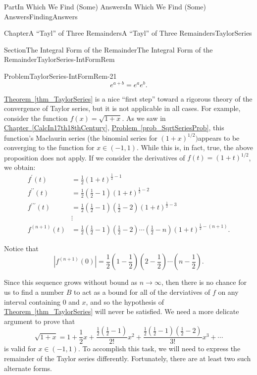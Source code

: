 \documentclass[oneside,10pt,]{book}
\newcommand{\xreffont}{\relax}
\numberwithin{equation}{part}
\newcommand{\amp}{&}
\begin{document}
\begin{partptx}{Part}{In Which We Find (Some) Answers}{}{In Which We Find (Some) Answers}{}{}{FindingAnswers}
\begin{chapterptx}{Chapter}{A ``Tayl'' of Three Remainders}{}{A ``Tayl'' of Three Remainders}{}{}{TaylorSeries}
\begin{sectionptx}{Section}{The Integral Form of the Remainder}{}{The Integral Form of the Remainder}{}{}{TaylorSeries-IntFormRem}
\begin{problem}{Problem}{}{TaylorSeries-IntFormRem-21}
\begin{equation*}
e^{a+b}=e^ae^b.
\end{equation*}
%
\end{problem}
\hyperref[thm_TaylorSeries]{Theorem~{\xreffont\ref{thm_TaylorSeries}}} is a nice ``first step'' toward a rigorous theory of the convergence of Taylor series, but it is not applicable in all cases. For example, consider the function \(f(x)=\sqrt{1+x}\). As we saw in \hyperref[CalcIn17th18thCentury]{Chapter~{\xreffont\ref{CalcIn17th18thCentury}}}, \hyperref[prob_SqrtSeriesProb]{Problem~{\xreffont\ref{prob_SqrtSeriesProb}}}, this function's Maclaurin series (the binomial series for \(\left(1+x\right)^{1/2})\)appears to be converging to the function for \(x\in(-1,1)\). While this is, in fact, true, the above proposition does not apply. If we consider the derivatives of \(f(t)=(1+t)^{1/2}\), we obtain:%
\begin{align*}
f^\prime(t)\amp =\frac{1}{2}(1+t)^{\frac{1}{2}-1}\\
f^{\prime\prime}(t)\amp =\frac{1}{2}\left(\frac{1}{2}-1\right)(1+t)^{\frac{1}{2}-2}\\
f^{\prime\prime\prime}(t)\amp =\frac{1}{2}\left(\frac{1}{2}-1\right)\left(\frac{1}{2}-2 \right)(1+t)^{\frac{1}{2}-3}\\
\amp \vdots\\
f^{(n+1)}(t)\amp =\frac{1}{2}\left(\frac{1}{2}-1\right)\left(\frac{1}{2}-2\right) \cdots\left(\frac{1}{2}-n\right)(1+t)^{\frac{1}{2}-(n+1)}\text{.}
\end{align*}
%
\par
Notice that%
\begin{equation*}
\left|f^{(n+1)}(0)\right|=\frac{1}{2}\left(1-\frac{1}{2}\right)\left(2-\frac{1}{2}\right)\cdots\left(n-\frac{1}{2}\right)\text{.}
\end{equation*}
%
\par
Since this sequence grows without bound as \(n\rightarrow\infty\), then there is no chance for us to find a number \(B\) to act as a bound for all of the derviatives of \(f\) on any interval containing 0 and\(\) \(x\), and so the hypothesis of \hyperref[thm_TaylorSeries]{Theorem~{\xreffont\ref{thm_TaylorSeries}}} will never be satisfied. We need a more delicate argument to prove that%
\begin{equation*}
\sqrt{1+x}=1+\frac{1}{2}x+\frac{\frac{1}{2}\left(\frac{1}{2}-1\right)}{2!}x^2+\frac{\frac{1}{2}\left(\frac{1}{2}-1\right)\left(\frac{1}{2}-2\right)}{3!}x^3+\cdots
\end{equation*}
is valid for \(x\in(-1,1)\). To accomplish this task, we will need to express the remainder of the Taylor series differently. Fortunately, there are at least two such alternate forms.%

\end{sectionptx}
\end{chapterptx}
\end{partptx}
\end{document}
